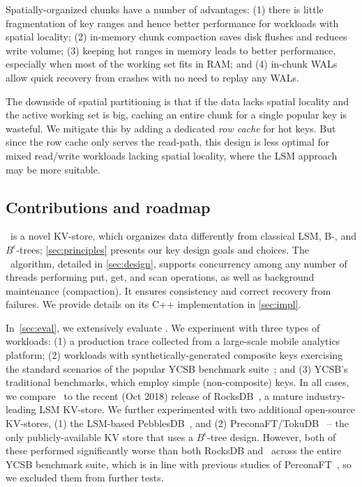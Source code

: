 Spatially-organized chunks have a number of advantages:
(1) there is little fragmentation of key ranges and hence better  performance for workloads with spatial locality; 
(2) in-memory chunk compaction saves  disk flushes and reduces write volume;  
(3) keeping hot ranges in memory leads to better performance, especially when most of the working set fits in RAM; and
(4) in-chunk WALs  allow quick recovery from crashes with no need to replay any WALs.

The downside of spatial partitioning is that if the data lacks spatial locality and the active working set is big, 
caching an entire chunk for a single popular key is wasteful. We mitigate this  by adding 
a dedicated \emph{row cache} for hot keys. But since the row cache only serves the read-path, 
this design is less optimal for mixed read/write workloads lacking spatial locality,
where the LSM approach may be more suitable.  

\subsection{Contributions and roadmap}

\sys\ is a novel KV-store, which organizes data differently from classical LSM, B-, and $B^{\epsilon}$-trees; \cref{sec:principles} presents our key design goals and choices. 
The \sys\ algorithm, detailed in \cref{sec:design}, supports concurrency among any number of threads performing put, get, and scan operations, as well as background maintenance (compaction). It ensures consistency and correct recovery from failures. 
We  provide details on its C++ implementation in \cref{sec:impl}. 

In~\cref{sec:eval}, we extensively evaluate \sys. 
We experiment with three types of workloads: (1) a production trace collected from a large-scale mobile analytics platform; 
(2)  workloads with synthetically-generated composite keys exercising the standard scenarios of the popular YCSB benchmark suite~\cite{YCSB};
and (3)  YCSB's traditional benchmarks, which employ simple (non-composite) keys.  
In all cases, we compare \sys\ to the recent (Oct 2018) release of RocksDB~\cite{RocksDB}, a mature industry-leading LSM KV-store. 
We further experimented with two additional open-source KV-stores, (1) the LSM-based PebblesDB~\cite{PebblesDB}, and (2) PreconaFT/TokuDB~\cite{TokuDB} -- the only
publicly-available KV store that uses a $B^{\epsilon}$-tree design. However, both of these performed significantly worse than both RocksDB and \sys\ across 
the entire YCSB benchmark suite, which is in line with previous studies of PerconaFT~\cite{tucana}, so we excluded them from further tests. 


